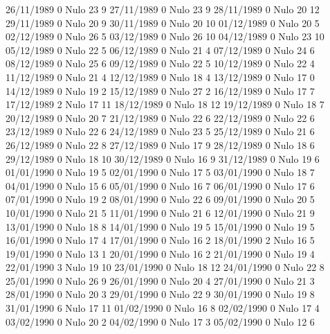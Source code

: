 26/11/1989  0     Nulo    23     9 
27/11/1989  0     Nulo    23     9 
28/11/1989  0     Nulo    20     12 
29/11/1989  0     Nulo    20     9 
30/11/1989  0     Nulo    20     10 
01/12/1989  0     Nulo    20     5 
02/12/1989  0     Nulo    26     5 
03/12/1989  0     Nulo    26     10 
04/12/1989  0     Nulo    23     10 
05/12/1989  0     Nulo    22     5 
06/12/1989  0     Nulo    21     4 
07/12/1989  0     Nulo    24     6 
08/12/1989  0     Nulo    25     6 
09/12/1989  0     Nulo    22     5 
10/12/1989  0     Nulo    22     4 
11/12/1989  0     Nulo    21     4 
12/12/1989  0     Nulo    18     4 
13/12/1989  0     Nulo    17     0 
14/12/1989  0     Nulo    19     2 
15/12/1989  0     Nulo    27     2 
16/12/1989  0     Nulo    17     7 
17/12/1989  2     Nulo    17     11 
18/12/1989  0     Nulo    18     12 
19/12/1989  0     Nulo    18     7 
20/12/1989  0     Nulo    20     7 
21/12/1989  0     Nulo    22     6 
22/12/1989  0     Nulo    22     6 
23/12/1989  0     Nulo    22     6 
24/12/1989  0     Nulo    23     5 
25/12/1989  0     Nulo    21     6 
26/12/1989  0     Nulo    22     8 
27/12/1989  0     Nulo    17     9 
28/12/1989  0     Nulo    18     6 
29/12/1989  0     Nulo    18     10 
30/12/1989  0     Nulo    16     9 
31/12/1989  0     Nulo    19     6 
01/01/1990  0     Nulo    19     5 
02/01/1990  0     Nulo    17     5 
03/01/1990  0     Nulo    18     7 
04/01/1990  0     Nulo    15     6 
05/01/1990  0     Nulo    16     7 
06/01/1990  0     Nulo    17     6 
07/01/1990  0     Nulo    19     2 
08/01/1990  0     Nulo    22     6 
09/01/1990  0     Nulo    20     5 
10/01/1990  0     Nulo    21     5 
11/01/1990  0     Nulo    21     6 
12/01/1990  0     Nulo    21     9 
13/01/1990  0     Nulo    18     8 
14/01/1990  0     Nulo    19     5 
15/01/1990  0     Nulo    19     5 
16/01/1990  0     Nulo    17     4 
17/01/1990  0     Nulo    16     2 
18/01/1990  2     Nulo    16     5 
19/01/1990  0     Nulo    13     1 
20/01/1990  0     Nulo    16     2 
21/01/1990  0     Nulo    19     4 
22/01/1990  3     Nulo    19     10 
23/01/1990  0     Nulo    18     12 
24/01/1990  0     Nulo    22     8 
25/01/1990  0     Nulo    26     9 
26/01/1990  0     Nulo    20     4 
27/01/1990  0     Nulo    21     3 
28/01/1990  0     Nulo    20     3 
29/01/1990  0     Nulo    22     9 
30/01/1990  0     Nulo    19     8 
31/01/1990  6     Nulo    17     11 
01/02/1990  0     Nulo    16     8 
02/02/1990  0     Nulo    17     4 
03/02/1990  0     Nulo    20     2 
04/02/1990  0     Nulo    17     3 
05/02/1990  0     Nulo    12     6 
